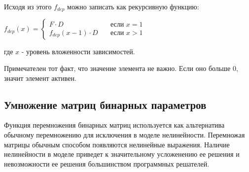 Исходя из этого $f_{dep}$ можно записать как рекурсивную функцию:
\begin{center}
  $
  f_{dep}(x) = 
  \begin{cases}
    F \cdot D & \quad \text{если } x = 1 \\
    f_{dep}(x - 1) \cdot D & \quad \text{если } x > 1
  \end{cases}
  $
\end{center}
где $x$ - уровень вложенности зависимостей.

Примечателен тот факт, что значение элемента не важно. Если оно больше $0$, значит элемент активен.

\subsection*{Умножение матриц бинарных параметров}
Функция перемножения бинарных матриц используется как альтернатива обычному перемножению для исключения в моделе нелинейности. Перемножая матрицы обычным способом появляются нелинейные выражения. Наличие нелинейности в моделе приведет к значительному усложенению ее решения и невозможности ее решения большинством программных решателей.

